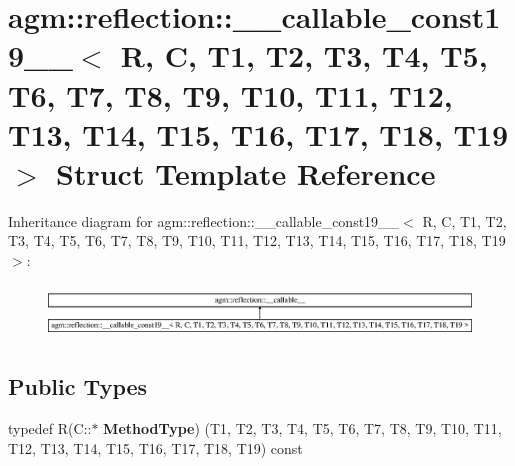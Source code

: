 \hypertarget{structagm_1_1reflection_1_1____callable__const19____}{}\section{agm\+:\+:reflection\+:\+:\+\_\+\+\_\+callable\+\_\+const19\+\_\+\+\_\+$<$ R, C, T1, T2, T3, T4, T5, T6, T7, T8, T9, T10, T11, T12, T13, T14, T15, T16, T17, T18, T19 $>$ Struct Template Reference}
\label{structagm_1_1reflection_1_1____callable__const19____}
Inheritance diagram for agm\+:\+:reflection\+:\+:\+\_\+\+\_\+callable\+\_\+const19\+\_\+\+\_\+$<$ R, C, T1, T2, T3, T4, T5, T6, T7, T8, T9, T10, T11, T12, T13, T14, T15, T16, T17, T18, T19 $>$\+:\begin{figure}[H]
\begin{center}
\leavevmode
\includegraphics[height=1.421320cm]{structagm_1_1reflection_1_1____callable__const19____}
\end{center}
\end{figure}
\subsection*{Public Types}
\begin{DoxyCompactItemize}
\item 
typedef R(C\+::$\ast$ {\bfseries Method\+Type}) (T1, T2, T3, T4, T5, T6, T7, T8, T9, T10, T11, T12, T13, T14, T15, T16, T17, T18, T19) const \hypertarget{structagm_1_1reflection_1_1____callable__const19_____a67d52f80d8905baa3ade808084f7a46e}{}\label{structagm_1_1reflection_1_1____callable__const19_____a67d52f80d8905baa3ade808084f7a46e}

\end{DoxyCompactItemize}
